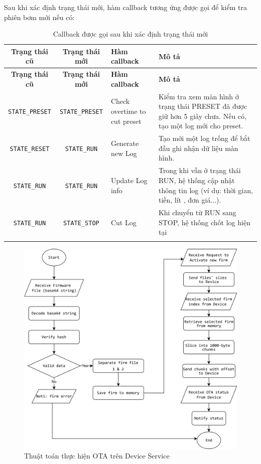 Sau khi xác định trạng thái mới, hàm callback tương ứng được gọi để kiểm tra phiên bơm mới nếu có:


\begin{longtable}{|c|c|p{3cm}|p{6cm}|}
\hline
\textbf{Trạng thái cũ} & \textbf{Trạng thái mới} & \textbf{Hàm callback} & \textbf{Mô tả} \\
\hline
\endfirsthead

\hline
\textbf{Trạng thái cũ} & \textbf{Trạng thái mới} & \textbf{Hàm callback} & \textbf{Mô tả} \\
\hline
\endhead

\texttt{STATE\_PRESET} & \texttt{STATE\_PRESET} & Check overtime to cut preset & Kiểm tra xem màn hình ở trạng thái PRESET đã được giữ hơn 5 giây chưa. Nếu có, tạo một log mới cho preset. \\
\hline

\texttt{STATE\_RESET} & \texttt{STATE\_RUN} & Generate new Log & Tạo mới một log trống để bắt đầu ghi nhận dữ liệu màn hình. \\
\hline

\texttt{STATE\_RUN} & \texttt{STATE\_RUN} & Update Log info & Trong khi vẫn ở trạng thái RUN, hệ thống cập nhật thông tin log (ví dụ: thời gian, tiền, lít , đơn giá...). \\
\hline

\texttt{STATE\_RUN} & \texttt{STATE\_STOP} & Cut Log & Khi chuyển từ RUN sang STOP, hệ thống chốt log hiện tại  \\
\hline

\caption{Callback được gọi sau khi xác định trạng thái mới}
\label{tab:callback-when-machine-state-changed}
\end{longtable}

\FloatBarrier

\begin{figure}[!ht]
     \centering
    \includegraphics[width=1.0\linewidth]{Figures/flowcharts-DeviceService-OTA.png}
    \caption{Thuật toán thực hiện OTA trên Device Service}
    \label{fig:flowcharts-DeviceService-OTA}
\end{figure}


